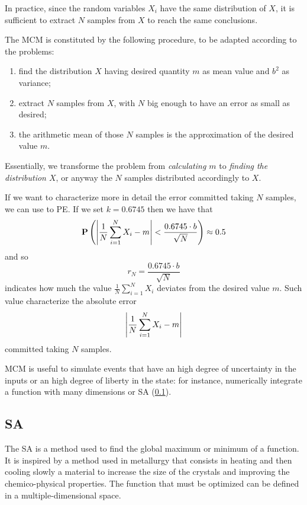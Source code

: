 \documentclass[dissertation.tex]{subfiles}
\begin{document}
In practice, since the random variables $X_i$ have the same
distribution of $X$, it is sufficient to extract $N$ samples from $X$ to
reach the same conclusions.

The \acf{MCM} is constituted by the following procedure, to be adapted
according to the problems:
\begin{enumerate}
\item find the distribution $X$ having desired quantity $m$ as mean
  value and $b^2$ as variance;
\item extract $N$ samples from $X$, with $N$ big enough to have an
  error as small as desired;
\item the arithmetic mean of those $N$ samples is the approximation of
  the desired value $m$.
\end{enumerate}
Essentially, we transforme the problem from \emph{calculating $m$} to
\emph{finding
  the distribution $X$}, or anyway the $N$ samples distributed
accordingly to $X$.

If we want to characterize more in detail the error committed taking
$N$ samples, we can use to \ac{PE}. If we set $k=0.6745$ then we
have that
\begin{equation*}
  \mathrm{\textbf{P}}\left(\left|\frac{1}{N}\sum_{i=1}^NX_i-m\right| <\frac{0.6745\cdot b}{\sqrt{N}}\right)\approx 0.5
\end{equation*}
and so
\begin{equation*}
  r_N = \frac{0.6745\cdot b}{\sqrt{N}}
\end{equation*}
indicates how much the value $\frac{1}{N}\sum_{i=1}^NX_i$ deviates
from the desired value $m$. Such value characterize the absolute error
\begin{equation*}
\left|\frac{1}{N}\sum_{i=1}^NX_i-m\right|  
\end{equation*}
committed taking $N$ samples.

\ac{MCM} is useful to simulate events that have an high degree of
uncertainty in the inputs or an high degree of liberty in the
state: for instance, numerically integrate a function with many
dimensions or \acf{SA} (\cref{sec:simulatedAnnealing}).

\subsection{\acf{SA}}\label{sec:simulatedAnnealing}
The \ac{SA} is a method used to find the global maximum or
minimum of a function. It is inspired by a method
used in metallurgy that consists in heating and then cooling slowly a
material to increase the size of the crystals and improving
the chemico-physical properties. The function that must be optimized
can be
defined in a multiple-dimensional space.
\end{document}
